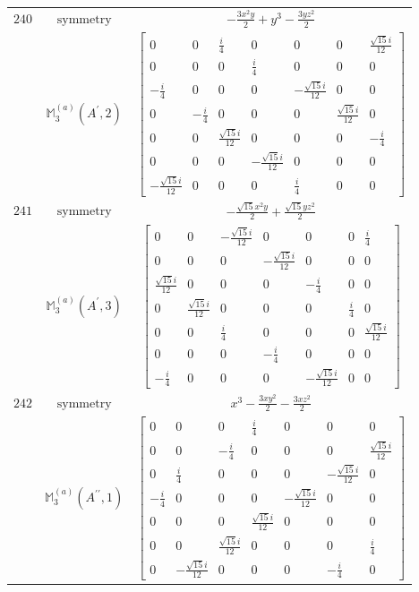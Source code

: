 \documentclass[fleqn,8pt,landscape]{jsarticle}
\begin{document}
\begin{longtable}{ccc}
$ 240 $ & $ \text{symmetry} $ & $ - \frac{3 x^{2} y}{2} + y^{3} - \frac{3 y z^{2}}{2} $ \\
$  $ & $ \mathbb{M}_{3}^{(a)}(A^{\prime},2) $ & $ \begin{bmatrix} 0 & 0 & \frac{i}{4} & 0 & 0 & 0 & \frac{\sqrt{15} i}{12} \\ 0 & 0 & 0 & \frac{i}{4} & 0 & 0 & 0 \\ - \frac{i}{4} & 0 & 0 & 0 & - \frac{\sqrt{15} i}{12} & 0 & 0 \\ 0 & - \frac{i}{4} & 0 & 0 & 0 & \frac{\sqrt{15} i}{12} & 0 \\ 0 & 0 & \frac{\sqrt{15} i}{12} & 0 & 0 & 0 & - \frac{i}{4} \\ 0 & 0 & 0 & - \frac{\sqrt{15} i}{12} & 0 & 0 & 0 \\ - \frac{\sqrt{15} i}{12} & 0 & 0 & 0 & \frac{i}{4} & 0 & 0 \end{bmatrix} $ \\ \hline
$ 241 $ & $ \text{symmetry} $ & $ - \frac{\sqrt{15} x^{2} y}{2} + \frac{\sqrt{15} y z^{2}}{2} $ \\
$  $ & $ \mathbb{M}_{3}^{(a)}(A^{\prime},3) $ & $ \begin{bmatrix} 0 & 0 & - \frac{\sqrt{15} i}{12} & 0 & 0 & 0 & \frac{i}{4} \\ 0 & 0 & 0 & - \frac{\sqrt{15} i}{12} & 0 & 0 & 0 \\ \frac{\sqrt{15} i}{12} & 0 & 0 & 0 & - \frac{i}{4} & 0 & 0 \\ 0 & \frac{\sqrt{15} i}{12} & 0 & 0 & 0 & \frac{i}{4} & 0 \\ 0 & 0 & \frac{i}{4} & 0 & 0 & 0 & \frac{\sqrt{15} i}{12} \\ 0 & 0 & 0 & - \frac{i}{4} & 0 & 0 & 0 \\ - \frac{i}{4} & 0 & 0 & 0 & - \frac{\sqrt{15} i}{12} & 0 & 0 \end{bmatrix} $ \\ \hline
$ 242 $ & $ \text{symmetry} $ & $ x^{3} - \frac{3 x y^{2}}{2} - \frac{3 x z^{2}}{2} $ \\
$  $ & $ \mathbb{M}_{3}^{(a)}(A^{\prime\prime},1) $ & $ \begin{bmatrix} 0 & 0 & 0 & \frac{i}{4} & 0 & 0 & 0 \\ 0 & 0 & - \frac{i}{4} & 0 & 0 & 0 & \frac{\sqrt{15} i}{12} \\ 0 & \frac{i}{4} & 0 & 0 & 0 & - \frac{\sqrt{15} i}{12} & 0 \\ - \frac{i}{4} & 0 & 0 & 0 & - \frac{\sqrt{15} i}{12} & 0 & 0 \\ 0 & 0 & 0 & \frac{\sqrt{15} i}{12} & 0 & 0 & 0 \\ 0 & 0 & \frac{\sqrt{15} i}{12} & 0 & 0 & 0 & \frac{i}{4} \\ 0 & - \frac{\sqrt{15} i}{12} & 0 & 0 & 0 & - \frac{i}{4} & 0 \end{bmatrix} $ \\ \hline

\end{longtable}
\end{document}
